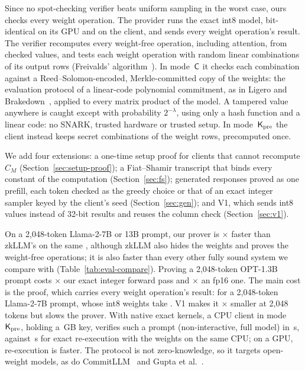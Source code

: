  Since no spot-checking verifier beats uniform sampling in
the worst case, ours checks every weight operation. The provider runs the exact int8 model,
bit-identical on its GPU and on the client, and sends every weight operation's result. The verifier
recomputes every weight-free operation, including attention, from checked values, and tests
each weight operation with random linear combinations of its output rows (Freivalds'
algorithm~\cite{freivalds1977}). In mode~$\mathsf{C}$ it checks each combination against a
Reed--Solomon-encoded, Merkle-committed copy of the weights: the evaluation protocol of a
linear-code polynomial commitment, as in Ligero and Brakedown~\cite{ligero,brakedown}, applied to
every matrix product of the model. A tampered value anywhere is caught except with probability
$2^{-\lambda}$, using only a hash function and a linear code: no SNARK, trusted hardware or trusted
setup. In mode~$\mathsf{K}_{\mathrm{pre}}$ the client instead keeps secret combinations of the weight rows, precomputed
once.

We add four extensions: a one-time setup proof for clients that cannot recompute $C_M$
(Section~\ref{sec:setup-proof}); a Fiat--Shamir transcript that
binds every constant of the computation (Section~\ref{sec:fs}); generated responses proved as one
prefill, each token checked as the greedy choice or that of an exact integer sampler keyed by the
client's seed (Section~\ref{sec:gen}); and V1, which sends int8 values instead of 32-bit results
and reuses the column check (Section~\ref{sec:v1}).

 On a 2{,}048-token Llama-2-7B or 13B prompt, our prover is \ZkllmSameGpuFactorRange{}$\times$
faster than zkLLM's on the same \PlatformGpu{}, although zkLLM also hides the weights and proves the
weight-free operations\TodoZkllmFactor{}; it is also faster than every other fully sound system
we compare with (Table~\ref{tab:eval-compare}). Proving a 2{,}048-token OPT-1.3B prompt costs
\ServeOptMOverUOneRange{}$\times$ our exact integer forward pass and \ServeOptMOverUTwoRange{}$\times$ an fp16
one. The main cost is the proof, which carries every weight operation's result:
\ProofLlamaLongC{} for a 2{,}048-token Llama-2-7B prompt, whose int8 weights take \WeightsLlama{}.
V1 makes it \VOneRatioRandom{}$\times$ smaller at 2{,}048 tokens but slows the prover. With native exact
kernels, a CPU client in mode~$\mathsf{K}_{\mathrm{pre}}$, holding a \KpreStoreGB{}\,GB key, verifies such a prompt (non-interactive, full model) in \CpuVerifyLong{}\,s, against
\CpuReexecLong{}\,s for exact re-execution with the weights on the same CPU; on a GPU, re-execution is faster\TodoCpuRatioIntro{}. The protocol is not zero-knowledge, so it
targets open-weight models, as do CommitLLM~\cite{commitllm2026} and Gupta et
al.~\cite{gupta2026private}.

